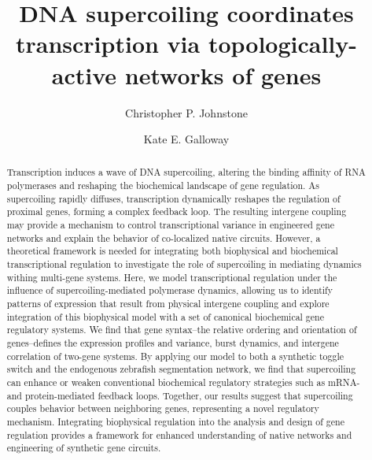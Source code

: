 \documentclass[11pt]{article}
\title{DNA supercoiling coordinates transcription via topologically-active networks of genes }
\author{Christopher P. Johnstone}
\author{Kate E. Galloway}
\affil{Department of Chemical Engineering, MIT, 25 Ames St., Cambridge, MA 02139, USA}
\date{ }
\begin{document}
\maketitle

\begin{abstract} \noindent
    Transcription induces a wave of DNA supercoiling, altering the binding affinity of RNA polymerases and reshaping the biochemical landscape of gene regulation. 
     As supercoiling rapidly diffuses, transcription dynamically reshapes the regulation of proximal genes, forming a complex feedback loop. The resulting intergene coupling may provide a mechanism to control transcriptional variance in engineered gene networks and explain the behavior of co-localized native circuits.
    However, a theoretical framework is needed for integrating  both biophysical and biochemical transcriptional regulation to investigate the role of supercoiling in mediating dynamics withing multi-gene systems.
    Here, we model transcriptional regulation under the influence of supercoiling-mediated polymerase dynamics, allowing us to identify patterns of expression that result from physical intergene coupling and explore integration of this biophysical model with a set of canonical biochemical gene regulatory systems.  
    We find that gene syntax--the relative ordering and orientation of genes--defines the expression profiles and variance, burst dynamics, and intergene correlation of two-gene systems. By applying our model to both a synthetic toggle switch and the endogenous zebrafish segmentation network, we find that supercoiling can enhance or weaken conventional biochemical regulatory strategies such as mRNA- and protein-mediated feedback loops. 
    Together, our results suggest that supercoiling couples behavior between neighboring genes, representing a novel regulatory mechanism. 
    Integrating biophysical regulation into the analysis and design of gene regulation provides a framework for enhanced understanding of native networks and engineering of synthetic gene circuits.
\end{abstract}
\end{document}
